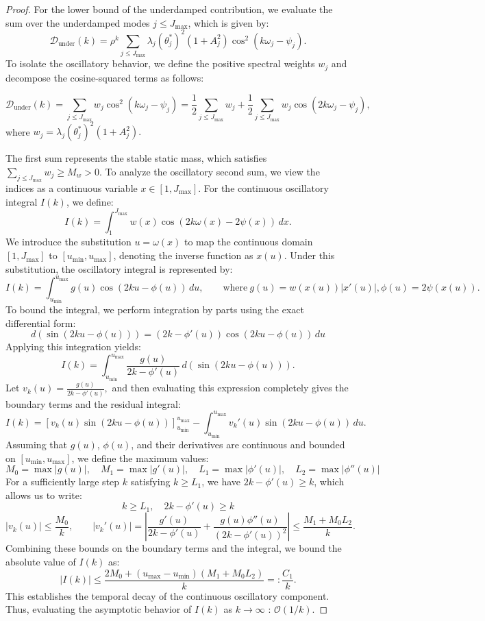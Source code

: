 \begin{proof}
For the lower bound of the underdamped contribution, we evaluate the sum over the underdamped modes $j \le J_{\max}$, which is given by:
\[
    \mathcal{D}_{\mathrm{under}}(k) = \rho^k \sum_{j \le J_{\max}} \lambda_j (\theta_j^*)^2 (1+A_j^2) \cos^2(k\omega_j - \psi_j).
\]
To isolate the oscillatory behavior, we define the positive spectral weights $w_j$ and decompose the cosine-squared terms as follows:

\[
    \mathcal{D}_{\mathrm{under}}(k) =\sum_{j \le J_{\max}} w_j \cos^2(k\omega_j - \psi_j) = \frac{1}{2} \sum_{j \le J_{\max}} w_j + \frac{1}{2} \sum_{j \le J_{\max}} w_j \cos(2k\omega_j - \psi_j),
\]
where $w_j = \lambda_j (\theta_j^*)^2 (1+A_j^2).$

The first sum represents the stable static mass, which satisfies $\sum_{j \le J_{\max}} w_j \ge M_w > 0$. To analyze the oscillatory second sum, we view the indices as a continuous variable $x \in [1, J_{\max}]$. For the continuous oscillatory integral $I(k)$, we define:
\[
    I(k) = \int_{1}^{J_{\max}} w(x) \cos(2k\omega(x) - 2\psi(x)) \, dx.
\]
We introduce the substitution $u = \omega(x)$ to map the continuous domain $[1, J_{\max}]$ to $[u_{\min}, u_{\max}]$, denoting the inverse function as $x(u)$.
Under this substitution, the oscillatory integral is represented by:
\[
    I(k) = \int_{u_{\min}}^{u_{\max}} g(u) \cos(2ku - \phi(u)) \, du, \qquad \text{where}\ g(u) = w(x(u)) \left| x'(u) \right|, \phi(u) = 2\psi(x(u)).
\]
To bound the integral, we perform integration by parts using the exact differential form:
\[
    d\left(\sin(2ku - \phi(u))\right) = (2k - \phi'(u)) \cos(2ku - \phi(u)) \, du
\]
Applying this integration yields:
\[
    I(k) = \int_{u_{\min}}^{u_{\max}} \frac{g(u)}{2k - \phi'(u)} \, d\left(\sin(2ku - \phi(u))\right).
\]
Let $v_k(u) = \frac{g(u)}{2k - \phi'(u)},$
and then evaluating this expression completely gives the boundary terms and the residual integral:
\[
    I(k) = \left[ v_k(u) \sin(2ku - \phi(u)) \right]_{u_{\min}}^{u_{\max}} - \int_{u_{\min}}^{u_{\max}} v_k'(u) \sin(2ku - \phi(u)) \, du.
\]
Assuming that $g(u)$, $\phi(u)$, and their derivatives are continuous and bounded on $[u_{\min}, u_{\max}]$, we define the maximum values:
\[
    M_0 = \max |g(u)|, \quad M_1 = \max |g'(u)|, \quad L_1 = \max |\phi'(u)|, \quad L_2 = \max |\phi''(u)|
\]
For a sufficiently large step $k$ satisfying $k \ge L_1$, we have $2k - \phi'(u) \ge k$, which allows us to write:
\[
    k \ge L_1, \quad 2k - \phi'(u) \ge k
\]
\[
    |v_k(u)| \le \frac{M_0}{k}, \qquad |v_k'(u)| = \left| \frac{g'(u)}{2k - \phi'(u)} + \frac{g(u)\phi''(u)}{(2k - \phi'(u))^2} \right| \le \frac{M_1 + M_0 L_2}{k}.
\]
Combining these bounds on the boundary terms and the integral, we bound the absolute value of $I(k)$ as:
\[
    |I(k)| \le \frac{2M_0 + (u_{\max} - u_{\min})(M_1 + M_0 L_2)}{k} =: \frac{C_1}{k}.
\]
This establishes the temporal decay of the continuous oscillatory component. Thus, evaluating the asymptotic behavior of $I(k)$ as $k \to \infty$ : $\mathcal{O}(1/k)$.


\end{proof}
